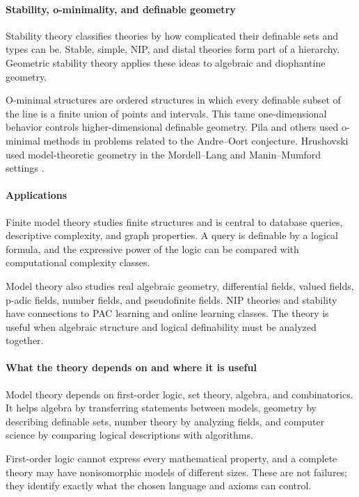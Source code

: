 \paragraph{Stability, o-minimality, and definable geometry}
Stability theory classifies theories by how complicated their definable sets and types can be. Stable, simple, NIP, and distal theories form part of a hierarchy. Geometric stability theory applies these ideas to algebraic and diophantine geometry.

O-minimal structures are ordered structures in which every definable subset of the line is a finite union of points and intervals. This tame one-dimensional behavior controls higher-dimensional definable geometry. Pila and others used o-minimal methods in problems related to the Andre--Oort conjecture. Hrushovski used model-theoretic geometry in the Mordell--Lang and Manin--Mumford settings \cite{model_theory_ref3}.

\paragraph{Applications}
Finite model theory studies finite structures and is central to database queries, descriptive complexity, and graph properties. A query is definable by a logical formula, and the expressive power of the logic can be compared with computational complexity classes.

Model theory also studies real algebraic geometry, differential fields, valued fields, p-adic fields, number fields, and pseudofinite fields. NIP theories and stability have connections to PAC learning and online learning classes. The theory is useful when algebraic structure and logical definability must be analyzed together.

\paragraph{What the theory depends on and where it is useful}
Model theory depends on first-order logic, set theory, algebra, and combinatorics. It helps algebra by transferring statements between models, geometry by describing definable sets, number theory by analyzing fields, and computer science by comparing logical descriptions with algorithms.

First-order logic cannot express every mathematical property, and a complete theory may have nonisomorphic models of different sizes. These are not failures; they identify exactly what the chosen language and axioms can control.

